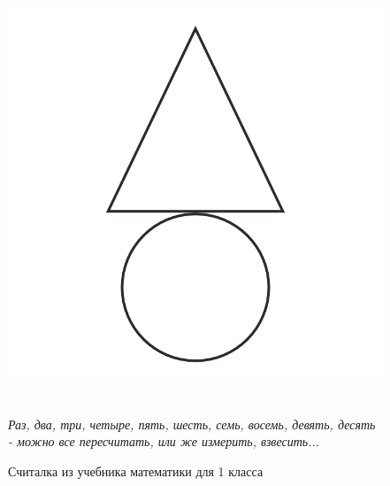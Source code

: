 
\begin{figure}[h!]
\begin{minipage}{0.45\linewidth}~\hfill
    \includegraphics[scale=0.3]{./img/tr}
	\hfill~
\end{minipage}
\begin{minipage}{0.5\linewidth}\setlength{\parindent}{1.5em}
\epigraph{\textit{Раз, два, три, четыре, пять, шесть, семь, восемь, девять, десять -
		можно все пересчитать, или же измерить, взвесить...
}}{Считалка из учебника математики для 1 класса}
\end{minipage}
\end{figure}

